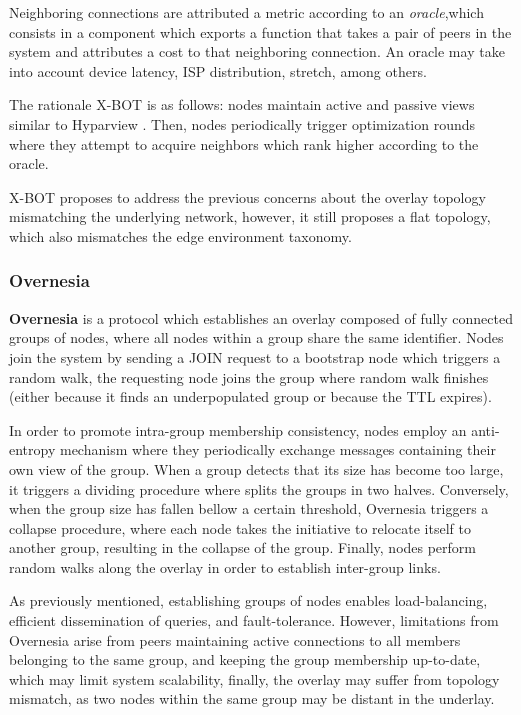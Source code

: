 Neighboring connections are attributed a metric according to an \textit{oracle},which consists in a component which exports a function that takes a pair of peers in the system and attributes a cost to that neighboring connection. An oracle may take into account device latency, ISP distribution, stretch, among others. 

The rationale X-BOT is as follows: nodes maintain active and passive views similar to Hyparview \cite{Hyparview}. Then, nodes periodically trigger optimization rounds where they attempt to acquire neighbors which rank higher according to the oracle.

X-BOT proposes to address the previous concerns about the overlay topology mismatching the underlying network, however, it still proposes a flat topology, which also mismatches the edge environment taxonomy. 

\subsubsection*{Overnesia}

\textbf{Overnesia} \cite{leitao2014overnesia} is a protocol which establishes an overlay composed of fully connected groups of nodes, where all nodes within a group share the same identifier. Nodes join the system by sending a JOIN request to a bootstrap node which triggers a random walk, the requesting node joins the group where random walk finishes (either because it finds an underpopulated group or because the TTL expires). 

In order to promote intra-group membership consistency, nodes employ an anti-entropy mechanism where they periodically exchange messages containing their own view of the group. When a group detects that its size has become too large, it triggers a dividing procedure where splits the groups in two halves. Conversely, when the group size has fallen bellow a certain threshold, Overnesia triggers a collapse procedure, where each node takes the initiative to relocate itself to another group, resulting in the collapse of the group. Finally, nodes perform random walks along the overlay in order to establish inter-group links.

As previously mentioned, establishing groups of nodes enables load-balancing, efficient dissemination of queries, and fault-tolerance. However, limitations from Overnesia arise from peers maintaining active connections to all members belonging to the same group, and keeping the group membership up-to-date, which may limit system scalability, finally, the overlay may suffer from topology mismatch, as two nodes within the same group may be distant in the underlay.

